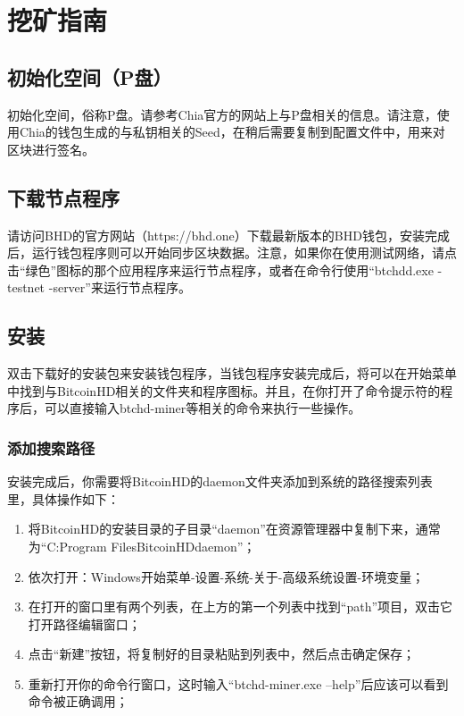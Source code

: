 \chapter{挖矿指南}
\section{初始化空间（P盘）}
\begin{flushleft}
    初始化空间，俗称P盘。请参考Chia官方的网站上与P盘相关的信息。请注意，使用Chia的钱包生成的与私钥相关的Seed，在稍后需要复制到配置文件中，用来对区块进行签名。
\end{flushleft}
\section{下载节点程序}
\begin{flushleft}
    请访问BHD的官方网站（https://bhd.one）下载最新版本的BHD钱包，安装完成后，运行钱包程序则可以开始同步区块数据。注意，如果你在使用测试网络，请点击``绿色''图标的那个应用程序来运行节点程序，或者在命令行使用``btchdd.exe -testnet -server''来运行节点程序。
\end{flushleft}
\section{安装}
\begin{flushleft}
    双击下载好的安装包来安装钱包程序，当钱包程序安装完成后，将可以在开始菜单中找到与BitcoinHD相关的文件夹和程序图标。并且，在你打开了命令提示符的程序后，可以直接输入btchd-miner等相关的命令来执行一些操作。
\end{flushleft}
\subsection{添加搜索路径}
\begin{flushleft}
    安装完成后，你需要将BitcoinHD的daemon文件夹添加到系统的路径搜索列表里，具体操作如下：
\end{flushleft}
\begin{enumerate}
    \item 将BitcoinHD的安装目录的子目录``daemon''在资源管理器中复制下来，通常为``C:Program FilesBitcoinHDdaemon''；
    \item 依次打开：Windows开始菜单-设置-系统-关于-高级系统设置-环境变量；
    \item 在打开的窗口里有两个列表，在上方的第一个列表中找到``path''项目，双击它打开路径编辑窗口；
    \item 点击``新建''按钮，将复制好的目录粘贴到列表中，然后点击确定保存；
    \item 重新打开你的命令行窗口，这时输入``btchd-miner.exe --help''后应该可以看到命令被正确调用；
\end{enumerate}
